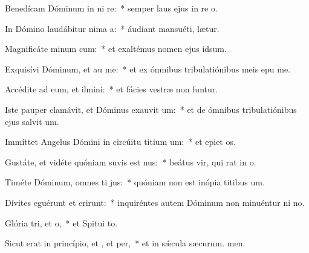 \item Benedícam Dóminum in ni re:~* semper laus ejus in re o.
\item In Dómino laudábitur nima a:~* áudiant mansuéti,  lætur.
\item Magnificáte minum cum:~* et exaltémus nomen ejus  idsum.
\item Exquisívi Dóminum, et au me:~* et ex ómnibus tribulatiónibus meis epu me.
\item Accédite ad eum, et ilmini:~* et fácies vestræ non funtur.
\item Iste pauper clamávit, et Dóminus exauvit um:~* et de ómnibus tribulatiónibus ejus salvit um.
\item Immíttet Angelus Dómini in circúitu titium um:~* et epiet os.
\item Gustáte, et vidéte quóniam suvis est nus:~* beátus vir, qui rat in o.
\item Timéte Dóminum, omnes ti jus:~* quóniam non est inópia titibus um.
\item Dívites eguérunt et erirunt:~* inquiréntes autem Dóminum non minuéntur ni no.
\item Glória tri, et o,~* et Spitui to.
\item Sicut erat in princípio, et , et per,~* et in sǽcula sæcurum. men.
